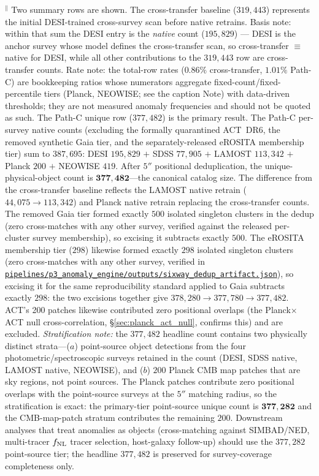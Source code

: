 \documentclass[aps,prd,twocolumn,superscriptaddress,showpacs,preprintnumbers,nofootinbib,longbibliography,floatfix]{revtex4-2}
\newcommand{\repoBase}{https://github.com/Hubify-Projects/bigbounce/blob/main}
\newcommand{\artifact}[1]{\href{\repoBase/#1}{\nolinkurl{#1}}}
\begin{document}
{$^\|$ Two summary rows are shown. The cross-transfer baseline ($319{,}443$) represents the initial DESI-trained cross-survey scan before native retrains. Basis note: within that sum the DESI entry is the \emph{native} count ($195{,}829$) --- DESI is the anchor survey whose model defines the cross-transfer scan, so cross-transfer $\equiv$ native for DESI, while all other contributions to the $319{,}443$ row are cross-transfer counts. Rate note: the total-row rates ($0.86\%$ cross-transfer, $1.01\%$ Path-C) are bookkeeping ratios whose numerators aggregate fixed-count/fixed-percentile tiers (Planck, NEOWISE; see the caption Note) with data-driven thresholds; they are not measured anomaly frequencies and should not be quoted as such. The Path-C unique row ($377{,}482$) is the primary result. The Path-C per-survey native counts (excluding the formally quarantined ACT~DR6, the removed synthetic Gaia tier, and the separately-released eROSITA membership tier) sum to $387{,}695$: DESI $195{,}829$ $+$ SDSS $77{,}905$ $+$ LAMOST $113{,}342$ $+$ Planck $200$ $+$ NEOWISE $419$. After $5''$ positional deduplication, the unique-physical-object count is $\mathbf{377{,}482}$---the canonical catalog size. The difference from the cross-transfer baseline reflects the LAMOST native retrain ($44{,}075 \to 113{,}342$) and Planck native retrain replacing the cross-transfer counts. The removed Gaia tier formed exactly $500$ isolated singleton clusters in the dedup (zero cross-matches with any other survey, verified against the released per-cluster survey membership), so excising it subtracts exactly $500$. The eROSITA membership tier ($298$) likewise formed exactly $298$ isolated singleton clusters (zero cross-matches with any other survey, verified in \artifact{pipelines/p3\_anomaly\_engine/outputs/sixway\_dedup\_artifact.json}), so excising it for the same reproducibility standard applied to Gaia subtracts exactly $298$: the two excisions together give $378{,}280 \to 377{,}780 \to 377{,}482$. ACT's 200 patches likewise contributed zero positional overlaps (the Planck$\times$ACT null cross-correlation, \S\ref{sec:planck_act_null}, confirms this) and are excluded. \textit{Stratification note:} the $377{,}482$ headline count contains two physically distinct strata---($a$) point-source object detections from the four photometric/spectroscopic surveys retained in the count (DESI, SDSS native, LAMOST native, NEOWISE), and ($b$) $200$ Planck CMB map patches that are sky regions, not point sources. The Planck patches contribute zero positional overlaps with the point-source surveys at the $5''$ matching radius, so the stratification is exact: the primary-tier point-source unique count is $\mathbf{377{,}282}$ and the CMB-map-patch stratum contributes the remaining $200$. Downstream analyses that treat anomalies as objects (cross-matching against SIMBAD/NED, multi-tracer $f_{\rm NL}$ tracer selection, host-galaxy follow-up) should use the $377{,}282$ point-source tier; the headline $377{,}482$ is preserved for survey-coverage completeness only.\\
}
\end{document}
